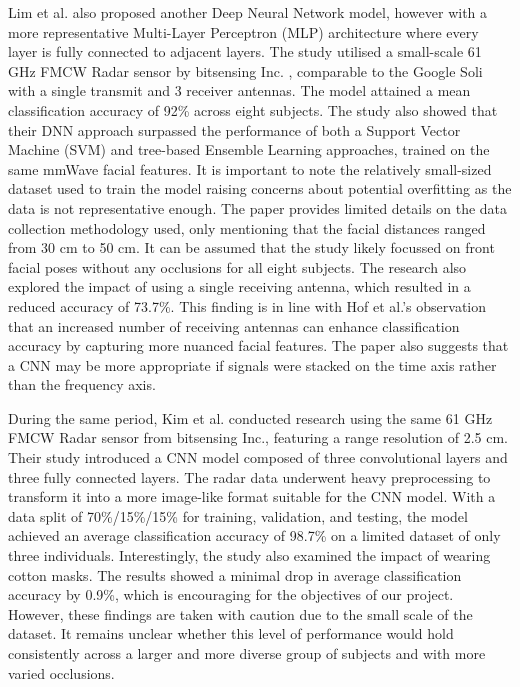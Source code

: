 \documentclass{interim}
\begin{document}
Lim et al. \cite{lim2020dnn} also proposed another Deep Neural Network model, however with a more representative Multi-Layer Perceptron (MLP) architecture where every layer is fully connected to adjacent layers. The study utilised a small-scale 61 GHz FMCW Radar sensor by bitsensing Inc. \cite{bitsensing2020bts60}, comparable to the Google Soli with a single transmit and 3 receiver antennas. The model attained a mean classification accuracy of 92\% across eight subjects. The study also showed that their DNN approach surpassed the performance of both a Support Vector Machine (SVM) and tree-based Ensemble Learning approaches, trained on the same mmWave facial features. It is important to note the relatively small-sized dataset used to train the model raising concerns about potential overfitting as the data is not representative enough. The paper provides limited details on the data collection methodology used, only mentioning that the facial distances ranged from 30 cm to 50 cm. It can be assumed that the study likely focussed on front facial poses without any occlusions for all eight subjects. The research also explored the impact of using a single receiving antenna, which resulted in a reduced accuracy of 73.7\%. This finding is in line with Hof et al.'s \cite{hof2020face} observation that an increased number of receiving antennas can enhance classification accuracy by capturing more nuanced facial features. The paper also suggests that a CNN may be more appropriate if signals were stacked on the time axis rather than the frequency axis.

During the same period, Kim et al. \cite{kim2020face} conducted research using the same 61 GHz FMCW Radar sensor from bitsensing Inc., featuring a range resolution of 2.5 cm. Their study introduced a CNN model composed of three convolutional layers and three fully connected layers. The radar data underwent heavy preprocessing to transform it into a more image-like format suitable for the CNN model. With a data split of 70\%/15\%/15\% for training, validation, and testing, the model achieved an average classification accuracy of 98.7\% on a limited dataset of only three individuals. Interestingly, the study also examined the impact of wearing cotton masks. The results showed a minimal drop in average classification accuracy by 0.9\%, which is encouraging for the objectives of our project. However, these findings are taken with caution due to the small scale of the dataset. It remains unclear whether this level of performance would hold consistently across a larger and more diverse group of subjects and with more varied occlusions.
\end{document}

